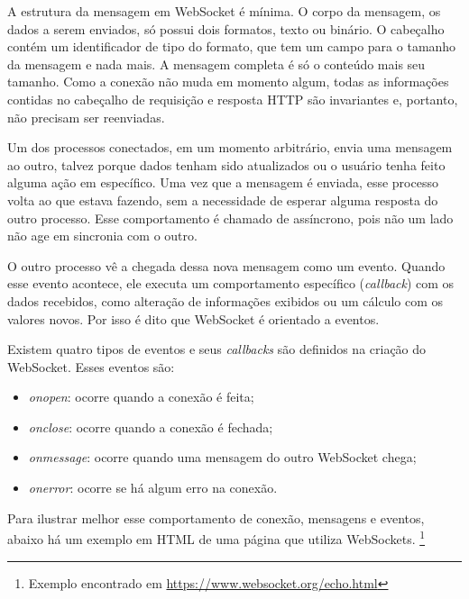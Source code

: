 \documentclass[a4paper,12pt]{article}
\begin{document}
A estrutura da mensagem em WebSocket é mínima. O corpo da mensagem, os dados a serem enviados, só possui dois formatos, texto ou binário. O cabeçalho contém um identificador de tipo do formato, que tem um campo para o tamanho da mensagem e nada mais. A mensagem completa é só o conteúdo mais seu tamanho. Como a conexão não muda em momento algum, todas as informações contidas no cabeçalho de requisição e resposta HTTP são invariantes e, portanto, não precisam ser reenviadas.

Um dos processos conectados, em um momento arbitrário, envia uma mensagem ao outro, talvez porque dados tenham sido atualizados ou o usuário tenha feito alguma ação em específico. Uma vez que a mensagem é enviada, esse processo volta ao que estava fazendo, sem a necessidade de esperar alguma resposta do outro processo. Esse comportamento é chamado de assíncrono, pois não um lado não age em sincronia com o outro.

O outro processo vê a chegada dessa nova mensagem como um evento. Quando esse evento acontece, ele executa um comportamento específico (\emph{callback}) com os dados recebidos, como alteração de informações exibidos ou um cálculo com os valores novos. Por isso é dito que WebSocket é orientado a eventos.

Existem quatro tipos de eventos e seus \emph{callbacks} são definidos na criação do WebSocket. Esses eventos são:
\begin{itemize}

\item\emph{onopen}: ocorre quando a conexão é feita;

\item\emph{onclose}: ocorre quando a conexão é fechada;

\item\emph{onmessage}: ocorre quando uma mensagem do outro WebSocket chega;

\item\emph{onerror}: ocorre se há algum erro na conexão.
\end{itemize}


Para ilustrar melhor esse comportamento de conexão, mensagens e eventos, abaixo há um exemplo em HTML de uma página que utiliza WebSockets.
\footnote{Exemplo encontrado em \url{https://www.websocket.org/echo.html}}
\end{document}
